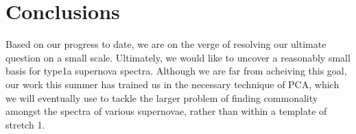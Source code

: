 \documentclass{article}
\begin{document}







\section{Conclusions}
\label{sec:conclusions}

Based on our progress to date, we are on the verge of resolving our
ultimate question on a small scale.  Ultimately, we would like to
uncover a reasonably small basis for type1a supernova spectra.
Although we are far from acheiving this goal, our work this summer has
trained us in the necessary technique of PCA, which we will eventually
use to tackle the larger problem of finding commonality amongst the
spectra of various supernovae, rather than within a template of
stretch 1.
\end{document}
